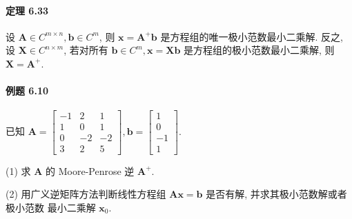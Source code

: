 \documentclass[12pt, a4paper, oneside, fontset=none]{ctexart}
\begin{document}
\paragraph*{定理 6.33} 设 $\bm{A} \in C^{m\times n}, \bm{b} \in C^m$, 则 $\bm{x} = \bm{A}^+\bm{b}$ 是方程组的唯一极小范数最小二乘解. 反之, 设
$\bm{X} \in C^{n\times m}$, 若对所有 $\bm{b} \in C^m, \bm{x} = \bm{Xb}$ 是方程组的极小范数最小二乘解, 则 $\bm{X} = \bm{A}^+$.

\paragraph*{例题 6.10} 已知 $\bm{A} = \begin{bmatrix}
        -1 & 2  & 1  \\
        1  & 0  & 1  \\
        0  & -2 & -2 \\
        3  & 2  & 5
    \end{bmatrix}, \bm{b} = \begin{bmatrix}
        1  \\
        0  \\
        -1 \\
        1
    \end{bmatrix}$.
\par (1) 求 $\bm{A}$ 的 Moore-Penrose 逆 $\bm{A}^{+}$.
\par (2) 用广义逆矩阵方法判断线性方程组 $\bm{Ax} = \bm{b}$ 是否有解, 并求其极小范数解或者极小范数
最小二乘解 $\bm{x}_0$.
\end{document}
